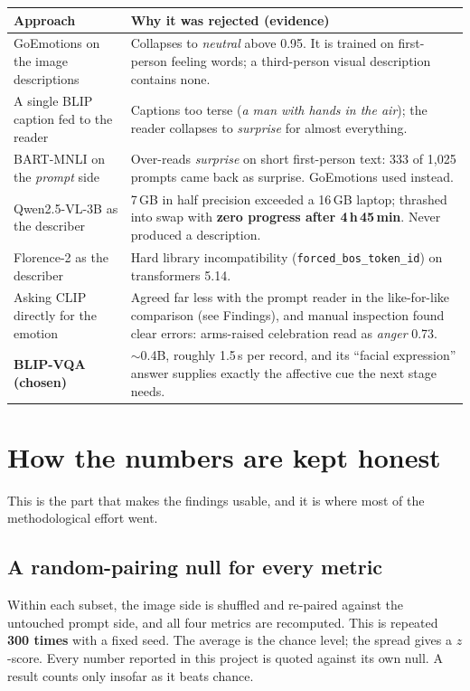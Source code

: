 \documentclass[11pt,a4paper]{article}
\newcommand{\say}[1]{\textit{\color{soft}#1}}
\begin{document}
\begin{center}
\begin{tabular}{@{}p{4.9cm}p{9.3cm}@{}}
\toprule
\textbf{Approach} & \textbf{Why it was rejected (evidence)}\\
\midrule
GoEmotions on the image descriptions & Collapses to \emph{neutral} above 0.95. It is trained on
first-person feeling words; a third-person visual description contains none.\\
A single BLIP caption fed to the reader & Captions too terse (\say{a man with hands in the air});
the reader collapses to \emph{surprise} for almost everything.\\
BART-MNLI on the \emph{prompt} side & Over-reads \emph{surprise} on short first-person text: 333 of
1{,}025 prompts came back as surprise. GoEmotions used instead.\\
Qwen2.5-VL-3B as the describer & 7\,GB in half precision exceeded a 16\,GB laptop; thrashed into
swap with \textbf{zero progress after 4\,h\,45\,min}. Never produced a description.\\
Florence-2 as the describer & Hard library incompatibility (\texttt{forced\_bos\_token\_id}) on
transformers 5.14.\\
Asking CLIP directly for the emotion & Agreed far less with the prompt reader in the like-for-like
comparison (see Findings), and manual inspection found clear errors: arms-raised celebration read as
\emph{anger} 0.73.\\
\midrule
\textbf{BLIP-VQA (chosen)} & $\sim$0.4B, roughly 1.5\,s per record, and its ``facial expression''
answer supplies exactly the affective cue the next stage needs.\\
\bottomrule
\end{tabular}
\end{center}

\section{How the numbers are kept honest}

This is the part that makes the findings usable, and it is where most of the methodological effort
went.

\subsection{A random-pairing null for every metric}

Within each subset, the image side is shuffled and re-paired against the untouched prompt side, and
all four metrics are recomputed. This is repeated \textbf{300 times} with a fixed seed. The average
is the chance level; the spread gives a $z$-score. Every number reported in this project is quoted
against its own null. A result counts only insofar as it beats chance.
\end{document}
